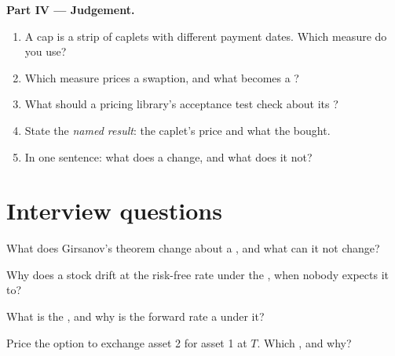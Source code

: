 \begin{problem}
\medskip\noindent\textbf{Part IV --- Judgement.}
\begin{enumerate}[resume]
\item A cap is a strip of caplets with different payment dates. Which measure do you use?
\item Which measure prices a swaption, and what becomes a ?
\item What should a pricing library's acceptance test check about its ?
\item State the \emph{named result}: the caplet's price and what the  bought.
\item In one sentence: what does a  change, and what does it not?
\end{enumerate}
\end{problem}

\section{Interview questions}

\begin{interviewq}\label{iq:qm:girsanov-and-changes-of-numeraire:1}
What does Girsanov's theorem change about a , and what can it not change?
\end{interviewq}

\begin{interviewq}\label{iq:qm:girsanov-and-changes-of-numeraire:2}
Why does a stock drift at the risk-free rate under the , when nobody expects it to?
\end{interviewq}

\begin{interviewq}\label{iq:qm:girsanov-and-changes-of-numeraire:3}
What is the , and why is the forward rate a  under it?
\end{interviewq}

\begin{interviewq}\label{iq:qm:girsanov-and-changes-of-numeraire:4}
Price the option to exchange asset 2 for asset 1 at $T$. Which , and why?
\end{interviewq}

